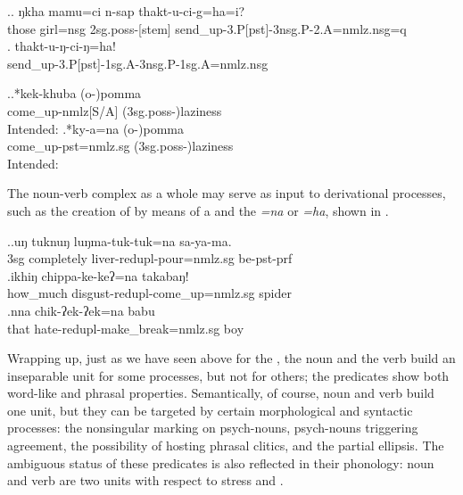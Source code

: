  	\ex.\ag. ŋkha mamu=ci n-sap thakt-u-ci-g=ha=i?\\
	those girl{\sc =nsg} {\sc 2sg.poss-[stem]} send\_up-{\sc 3.P[pst]-3nsg.P-2.A=nmlz.nsg=q}\\
	\bg. thakt-u-ŋ-ci-ŋ=ha!\\
	send\_up-{\sc 3.P[pst]-1sg.A-3nsg.P-1sg.A=nmlz.nsg}\\

	\ex.\ag.*kek-khuba (o-)pomma\\
	come\_up-{\sc nmlz[S/A]} ({\sc 3sg.poss-})laziness\\
	Intended: 
	\bg.*ky-a=na (o-)pomma\\
	come\_up{\sc -pst=nmlz.sg} ({\sc 3sg.poss-})laziness\\
	Intended: 

	
The noun-verb complex as a whole may serve as input to derivational processes, such as the creation of  by means of a  and the  \emph{=na} or \emph{=ha}, shown in \Next. 

\ex.\ag.uŋ tuknuŋ    luŋma-tuk-tuk=na       sa-ya-ma.\\
{\sc 3sg} completely liver-{\sc redupl-}pour{\sc =nmlz.sg}  be{\sc [3]-pst-prf}\\
\bg.ikhiŋ chippa-ke-keʔ=na  takabaŋ!\\
how\_much disgust-{\sc redupl-}come\_up{\sc =nmlz.sg} spider\\
\bg.nna chik-ʔek-ʔek=na  babu\\
that hate-{\sc redupl-}make\_break{\sc =nmlz.sg} boy\\


Wrapping up, just as we have seen above for the , the noun and the verb build an inseparable unit for some processes, but not for others; the predicates show both word-like and phrasal properties. Semantically, of course, noun and verb build one unit, but  they can be targeted by certain morphological and syntactic processes: the nonsingular marking on psych-nouns, psych-nouns triggering agreement, the possibility of hosting phrasal clitics, and the partial ellipsis. The ambiguous status of these predicates is also reflected in their phonology: noun and verb are two units with respect to stress and .  

